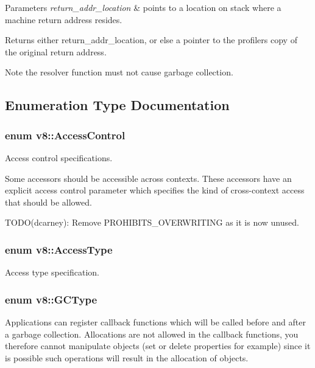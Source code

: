 \begin{DoxyParams}{Parameters}
{\em return\+\_\+addr\+\_\+location} & points to a location on stack where a machine return address resides. \\
\hline
\end{DoxyParams}
\begin{DoxyReturn}{Returns}
either return\+\_\+addr\+\_\+location, or else a pointer to the profiler\textquotesingle{}s copy of the original return address.
\end{DoxyReturn}
\begin{DoxyNote}{Note}
the resolver function must not cause garbage collection. 
\end{DoxyNote}


\subsection{Enumeration Type Documentation}
\hypertarget{namespacev8_a31d8355cb043d7d2dda3f4a52760b64e}{}
\subsubsection[{Access\+Control}]{\setlength{\rightskip}{0pt plus 5cm}enum {\bf v8\+::\+Access\+Control}}\label{namespacev8_a31d8355cb043d7d2dda3f4a52760b64e}
Access control specifications.

Some accessors should be accessible across contexts. These accessors have an explicit access control parameter which specifies the kind of cross-\/context access that should be allowed.

T\+O\+D\+O(dcarney)\+: Remove P\+R\+O\+H\+I\+B\+I\+T\+S\+\_\+\+O\+V\+E\+R\+W\+R\+I\+T\+I\+N\+G as it is now unused. \hypertarget{namespacev8_add8bef6469c5b94706584124e610046c}{}
\subsubsection[{Access\+Type}]{\setlength{\rightskip}{0pt plus 5cm}enum {\bf v8\+::\+Access\+Type}}\label{namespacev8_add8bef6469c5b94706584124e610046c}
Access type specification. \hypertarget{namespacev8_ac109d6f27e0c0f9ef4e98bcf7a806cf2}{}
\subsubsection[{G\+C\+Type}]{\setlength{\rightskip}{0pt plus 5cm}enum {\bf v8\+::\+G\+C\+Type}}\label{namespacev8_ac109d6f27e0c0f9ef4e98bcf7a806cf2}
Applications can register callback functions which will be called before and after a garbage collection. Allocations are not allowed in the callback functions, you therefore cannot manipulate objects (set or delete properties for example) since it is possible such operations will result in the allocation of objects. \hypertarget{namespacev8_a06f34fa4fa4cfc8518366808d1d461c1}{}
